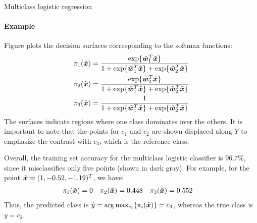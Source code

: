 \begin{frame}{Multiclass logistic regression}
\framesubtitle{Example}
Figure plots the decision surfaces
    corresponding to the softmax functions:
    \begin{align*}
        \pi_1(\tilde{{\boldsymbol x}}) & = \frac{\exp\{ \tilde{{\boldsymbol w}}_1^T\tilde{{\boldsymbol x}} \}}{1 + \exp\{ \tilde{{\boldsymbol w}}_1^T\tilde{{\boldsymbol x}} \} + 
            \exp\{\tilde{{\boldsymbol w}}_2^T\tilde{{\boldsymbol x}} \}}\\
        \pi_2(\tilde{{\boldsymbol x}}) & = \frac{\exp\{ \tilde{{\boldsymbol w}}_2^T\tilde{{\boldsymbol x}} \}}{1 + \exp\{ \tilde{{\boldsymbol w}}_1^T\tilde{{\boldsymbol x}} \} + 
            \exp\{\tilde{{\boldsymbol w}}_2^T\tilde{{\boldsymbol x}} \}}\\
        \pi_3(\tilde{{\boldsymbol x}}) & = \frac{1}{1 + \exp\{ \tilde{{\boldsymbol w}}_1^T\tilde{{\boldsymbol x}} \} + 
            \exp\{\tilde{{\boldsymbol w}}_2^T\tilde{{\boldsymbol x}} \}}
    \end{align*}
    The surfaces indicate regions where one class dominates over the
    others. It is important to note that the points for $c_1$ and $c_2$
    are shown displaced along $Y$ to emphasize the contrast with $c_3$, which is
    the reference class.
    
    Overall, 
    the training set accuracy for the multiclass logistic classifier is
    $96.7\%$, since it misclassifies only five points (shown in dark gray). 
    For
    example, for the point $\tilde{{\boldsymbol x}} = (1, -0.52, -1.19)^T$, we have:
    \begin{align*}
        \pi_1(\tilde{{\boldsymbol x}}) & = 0 & \pi_2(\tilde{{\boldsymbol x}}) & = 0.448 & \pi_3(\tilde{{\boldsymbol x}}) & = 0.552
    \end{align*}
    Thus, the predicted class is $\hat{y} = \arg\max_{c_i} \{ \pi_i(\tilde{{\boldsymbol x}}) \} =
    c_3$, whereas the true class is
    $y=c_2$. 
\end{frame}
%
%
%
%
%
%
%

